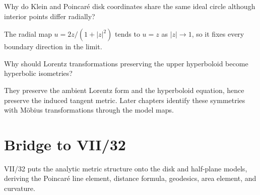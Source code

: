 \begin{problem}\label{prob:vii31-ch04}
Why do Klein and Poincaré disk coordinates share the same ideal circle although interior points differ radially?
\end{problem}
\begin{solution}
The radial map \(u=2z/(1+|z|^2)\) tends to \(u=z\) as \(|z|\to1\), so it fixes every boundary direction in the limit.
\end{solution}

\begin{problem}\label{prob:vii31-ch05}
Why should Lorentz transformations preserving the upper hyperboloid become hyperbolic isometries?
\end{problem}
\begin{solution}
They preserve the ambient Lorentz form and the hyperboloid equation, hence preserve the induced tangent metric. Later chapters identify these symmetries with Möbius transformations through the model maps.
\end{solution}

\section*{Bridge to VII/32}
VII/32 puts the analytic metric structure onto the disk and half-plane models, deriving the Poincaré line element, distance formula, geodesics, area element, and curvature.
